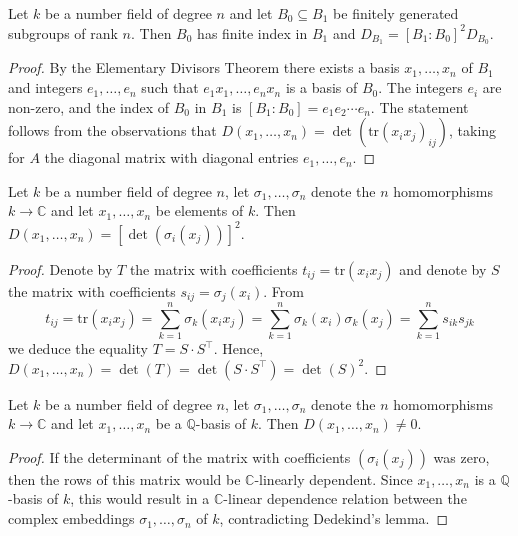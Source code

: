 \documentclass[12pt, a4paper]{article}
\begin{document}
\begin{proposition}
    Let \( k \) be a number field of degree \( n \) and let \( B_0 \subseteq B_1 \) be finitely generated subgroups of rank \( n \). Then \( B_0 \) has finite index in \( B_1 \) and \( D_{B_1} = [B_1 : B_0]^2 D_{B_0} \).
\end{proposition}

\begin{proof}
    By the Elementary Divisors Theorem there exists a basis \( x_1, \ldots, x_n \) of \( B_1 \) and integers \( e_1, \ldots, e_n \) such that \( e_1x_1, \ldots, e_nx_n \) is a basis of \( B_0 \). The integers \( e_i \) are non-zero, and the index of \( B_0 \) in \( B_1 \) is \( [B_1 : B_0] = e_1e_2 \cdots e_n \). The statement follows from the observations that \(D(x_1,\ldots,x_n)=\det(\text{tr}(x_ix_j)_{ij})\), taking for \( A \) the diagonal matrix with diagonal entries \( e_1, \ldots, e_n \). 
\end{proof}

\begin{mdprop}
    Let \( k \) be a number field of degree \( n \), let \( \sigma_1, \ldots, \sigma_n \) denote the \( n \) homomorphisms \( k \rightarrow \mathbb{C} \) and let \( x_1, \ldots, x_n \) be elements of \( k \). Then \( D(x_1, \ldots, x_n) = [\det(\sigma_i(x_j))]^2 \).
\end{mdprop}

\begin{proof}
    Denote by \( T \) the matrix with coefficients \( t_{ij} = \text{tr}(x_ix_j) \) and denote by \( S \) the matrix with coefficients \( s_{ij} = \sigma_j(x_i) \). From
    \[
    t_{ij} = \text{tr}(x_ix_j) = \sum_{k=1}^{n} \sigma_k(x_ix_j) = \sum_{k=1}^{n} \sigma_k(x_i)\sigma_k(x_j) = \sum_{k=1}^{n} s_{ik}s_{jk}
    \]
    we deduce the equality \(T=S\cdot S^{\top}\). Hence, \(D(x_1,\ldots,x_n)=\det(T)=\det(S\cdot S^{\top})=\det(S)^2\).
\end{proof}

\begin{corollary}
    Let \( k \) be a number field of degree \( n \), let \( \sigma_1, \ldots, \sigma_n \) denote the \( n \) homomorphisms \( k \to \mathbb{C} \) and let \( x_1, \ldots, x_n \) be a \( \mathbb{Q} \)-basis of \( k \). Then \( D(x_1, \ldots, x_n) \neq 0 \).
\end{corollary}

\begin{proof}
    If the determinant of the matrix with coefficients \( (\sigma_i(x_j)) \) was zero, then the rows of this matrix would be \( \mathbb{C} \)-linearly dependent. Since \( x_1, \ldots, x_n \) is a \( \mathbb{Q} \)-basis of \( k \), this would result in a \( \mathbb{C} \)-linear dependence relation between the complex embeddings \( \sigma_1, \ldots, \sigma_n \) of \( k \), contradicting Dedekind's lemma. 
\end{proof}
\end{document}
